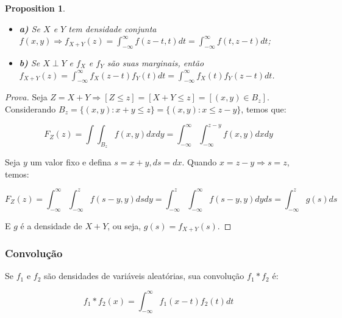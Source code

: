 \documentclass[
]{article}
\providecommand{\tightlist}{%
  \setlength{\itemsep}{0pt}\setlength{\parskip}{0pt}}
\newtheorem{proposition}{Proposition}[section]
\theoremstyle{definition}
\theoremstyle{definition}
\theoremstyle{definition}
\theoremstyle{definition}
\theoremstyle{remark}
\begin{document}
\begin{proposition}
\protect\hypertarget{prp:denssoma}{}\label{prp:denssoma}\leavevmode

\begin{itemize}
\tightlist
\item
  \textbf{a)} Se \(X\) e \(Y\) tem densidade conjunta \(f(x,y) \Rightarrow f_{X+Y}(z) = \int_{-\infty}^{\infty}f(z-t,t)dt = \int_{-\infty}^{\infty}f(t,z-t)dt\);
\item
  \textbf{b)} Se \(X \perp Y\) e \(f_{X}\) e \(f_{Y}\) são suas marginais, então \(f_{X+Y}(z) = \int_{-\infty}^{\infty}f_{X}(z-t)f_{Y}(t)dt = \int_{-\infty}^{\infty}f_{X}(t)f_{Y}(z-t)dt\).
\end{itemize}

\end{proposition}

\begin{proof}[Prova]
Seja \(Z = X+Y \Rightarrow [Z \le z] = [X+Y \le z] = [(x,y) \in B_{z}]\). Considerando \(B_{z} = \{(x,y):x+y \le z\} = \{(x,y):x \le z-y\}\), temos que:

\begin{equation*}
F_{Z}(z) = \int\int_{B_{z}}f(x,y)dxdy = \int_{-\infty}^{\infty}\int_{-\infty}^{z-y}f(x,y)dxdy
\end{equation*}

Seja \(y\) um valor fixo e defina \(s=x+y, ds = dx\). Quando \(x=z-y \Rightarrow s=z\), temos:

\begin{equation*}
F_{Z}(z) = \int_{-\infty}^{\infty}\int_{-\infty}^{z}f(s-y,y)dsdy = \int_{-\infty}^{z}\int_{-\infty}^{\infty}f(s-y,y)dyds = \int_{-\infty}^{z}g(s)ds
\end{equation*}

E \(g\) é a densidade de \(X+Y\), ou seja, \(g(s) = f_{X+Y}(s)\).
\end{proof}

\hypertarget{convoluuxe7uxe3o}{%
\subsubsection{Convolução}\label{convoluuxe7uxe3o}}

Se \(f_{1}\) e \(f_{2}\) são densidades de variáveis aleatórias, sua convolução \(f_{1}*f_{2}\) é:

\begin{equation*}
f_{1}*f_{2}(x) = \int_{-\infty}^{\infty}f_{1}(x-t)f_{2}(t)dt
\end{equation*}
\end{document}

